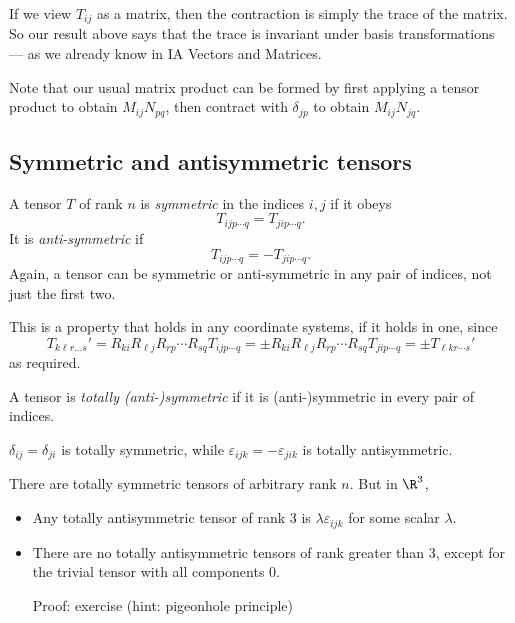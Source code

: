 \documentclass[a4paper]{article}
\begin{document}
If we view $T_{ij}$ as a matrix, then the contraction is simply the trace of the matrix. So our result above says that the trace is invariant under basis transformations --- as we already know in IA Vectors and Matrices.

Note that our usual matrix product can be formed by first applying a tensor product to obtain $M_{ij}N_{pq}$, then contract with $\delta_{jp}$ to obtain $M_{ij}N_{jq}$.
\subsection{Symmetric and antisymmetric tensors}
\begin{defi}
  A tensor $T$ of rank $n$ is \emph{symmetric} in the indices $i,j$ if it obeys
  \[
    T_{ijp\cdots q} = T_{jip\cdots q}.
  \]
  It is \emph{anti-symmetric} if
  \[
    T_{ijp\cdots q} = -T_{jip\cdots q}.
  \]
  Again, a tensor can be symmetric or anti-symmetric in any pair of indices, not just the first two.
\end{defi}

This is a property that holds in any coordinate systems, if it holds in one, since
\[
  T_{k\ell r\ldots s}' = R_{ki}R_{\ell j}R_{rp}\cdots R_{sq}T_{ijp\cdots q} = \pm R_{ki} R_{\ell j} R_{rp}\cdots R_{sq}T_{jip\cdots q} = \pm T_{\ell kr\cdots s}'
\]
as required.

\begin{defi}
  A tensor is \emph{totally (anti-)symmetric} if it is (anti-)symmetric in every pair of indices.
\end{defi}

\begin{eg}
  $\delta_{ij} = \delta_{ji}$ is totally symmetric, while $\varepsilon_{ijk} = -\varepsilon_{jik}$ is totally antisymmetric.

  There are totally symmetric tensors of arbitrary rank $n$. But in $\R^3$,
  \begin{itemize}
    \item Any totally antisymmetric tensor of rank 3 is $\lambda \varepsilon_{ijk}$ for some scalar $\lambda$.
    \item There are no totally antisymmetric tensors of rank greater than $3$, except for the trivial tensor with all components $0$.

      Proof: exercise (hint: pigeonhole principle)
  \end{itemize}
\end{eg}
\end{document}
